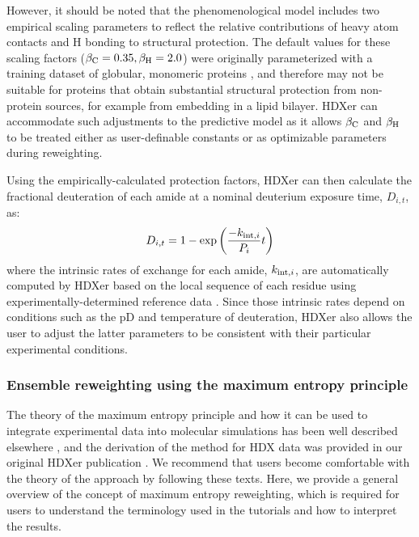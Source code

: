 \documentclass[9pt,tutorial,ASAPversion]{livecoms}
\begin{document}
However, it should be noted that the phenomenological model includes two empirical scaling parameters to reflect the relative contributions of heavy atom contacts and H bonding to structural protection. 
The default values for these scaling factors ($\beta_\textnormal{C} = 0.35, \beta_\textnormal{H} = 2.0$) were originally parameterized with a training dataset of globular, monomeric proteins \cite{BestVendruscolo2006}, and therefore may not be suitable for proteins that obtain substantial structural protection from non-protein sources, for example from embedding in a lipid bilayer.
HDXer can accommodate such adjustments to the predictive model as it allows $\beta_\textnormal{C}$ and $\beta_\textnormal{H}$ to be treated either as user-definable constants or as optimizable parameters during reweighting.

Using the empirically-calculated protection factors, HDXer can then calculate the fractional deuteration of each amide at a nominal deuterium exposure time, $D_{i,t}$, as:
\begin{equation}\label{Df_eqn}
    D_{i,t} = 1 - \exp\left( \frac{-k_{\textnormal{int},i}}{P_i}t \right)
\end{equation}
where the intrinsic rates of exchange for each amide, $k_{\textnormal{int},i}$, are automatically computed by HDXer based on the local sequence of each residue using experimentally-determined reference data \cite{Bai1993, Nguyen2018}. 
Since those intrinsic rates depend on conditions such as the pD and temperature of deuteration, HDXer also allows the user to adjust the latter parameters to be consistent with their particular experimental conditions.

\subsubsection{Ensemble reweighting using the maximum entropy principle}\label{maxent_theory_sect}
The theory of the maximum entropy principle and how it can be used to integrate experimental data into molecular simulations has been well described elsewhere \cite{Pitera2012, Boomsma2014, Marinelli2019, Hummer2015}, and the derivation of the method for HDX data was provided in our original HDXer publication \cite{Bradshaw2020}.
We recommend that users become comfortable with the theory of the approach by following these texts. 
Here, we provide a general overview of the concept of maximum entropy reweighting, which is required for users to understand the terminology used in the tutorials and how to interpret the results.
\end{document}
